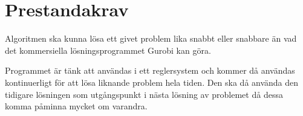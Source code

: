 \section{Prestandakrav}
Algoritmen ska kunna lösa ett givet problem lika snabbt eller snabbare än vad det kommersiella lösningsprogrammet Gurobi kan göra. 

Programmet är tänk att användas i ett reglersystem och kommer då användas kontinuerligt för att lösa liknande problem hela tiden. Den ska då använda den tidigare lösningen som utgångspunkt i nästa lösning av problemet då dessa komma påminna mycket om varandra.
\begin{LIPSkravlista}
\end{LIPSkravlista}
